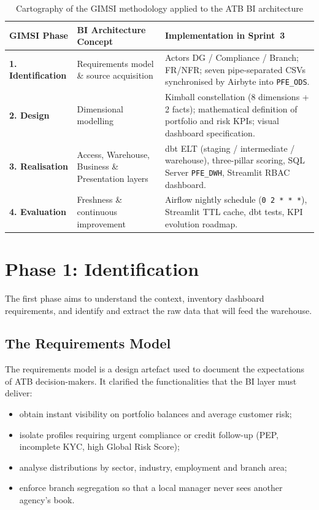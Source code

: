\begin{table}[H]
\centering
\caption{Cartography of the GIMSI methodology applied to the ATB BI architecture}
\label{tab:gimsi_phases}
\renewcommand{\arraystretch}{1.25}
\scriptsize
\begin{tabular}{|p{2.6cm}|p{4.0cm}|p{7.4cm}|}
\hline
\rowcolor{blue!15}
\textbf{GIMSI Phase} & \textbf{BI Architecture Concept} & \textbf{Implementation in Sprint~3} \\
\hline
\textbf{1. Identification} & Requirements model \& source acquisition & Actors DG / Compliance / Branch; FR/NFR; seven pipe-separated CSVs synchronised by Airbyte into \texttt{PFE\_ODS}. \\
\hline
\textbf{2. Design} & Dimensional modelling & Kimball constellation (8 dimensions + 2 facts); mathematical definition of portfolio and risk KPIs; visual dashboard specification. \\
\hline
\textbf{3. Realisation} & Access, Warehouse, Business \& Presentation layers & dbt ELT (staging / intermediate / warehouse), three-pillar scoring, SQL Server \texttt{PFE\_DWH}, Streamlit RBAC dashboard. \\
\hline
\textbf{4. Evaluation} & Freshness \& continuous improvement & Airflow nightly schedule (\texttt{0 2 * * *}), Streamlit TTL cache, dbt tests, KPI evolution roadmap. \\
\hline
\end{tabular}
\end{table}

\section{Phase 1: Identification}
\label{sec:gimsi_phase1}
The first phase aims to understand the context, inventory dashboard requirements,
and identify and extract the raw data that will feed the warehouse.

\subsection{The Requirements Model}
The requirements model is a design artefact used to document the expectations of
ATB decision-makers. It clarified the functionalities that the BI layer must
deliver:
\begin{itemize}
    \item obtain instant visibility on portfolio balances and average customer risk;
    \item isolate profiles requiring urgent compliance or credit follow-up
          (PEP, incomplete KYC, high Global Risk Score);
    \item analyse distributions by sector, industry, employment and branch area;
    \item enforce branch segregation so that a local manager never sees another
          agency's book.
\end{itemize}

